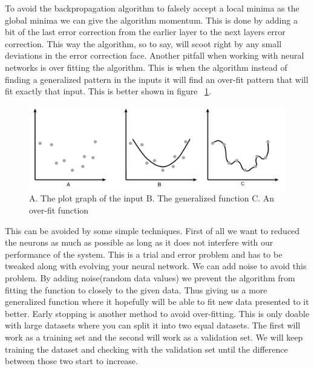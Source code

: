 To avoid the backpropagation algorithm to falsely accept a local minima as the global minima we can give the algorithm momentum. This is done by adding a bit of the last error correction from the earlier layer to the next layers error correction. This way the algorithm, so to say, will scoot right by any small deviations in the error correction face.
\newline
Another pitfall when working with neural networks is over fitting the algorithm. This is when the algorithm instead of finding a generalized pattern in the inputs it will find an over-fit pattern that will fit exactly that input. This is better shown in figure ~\ref{fig:overfitting}.
\begin{figure}[h!]
\centering
\includegraphics[width=0.8\linewidth,natwidth=1262,natheight=415]{billeder/overfitting.png}
\caption{A. The plot graph of the input B. The generalized function C. An over-fit function}
\label{fig:overfitting}
\end{figure}
This can be avoided by some simple techniques. First of all we want to reduced the neurons as much as possible as long as it does not interfere with our performance of the system. This is a trial and error problem and has to be tweaked along with evolving your neural network. We can add noise to avoid this problem. By adding noise(random data values) we prevent the algorithm from fitting the function to closely to the given data. Thus giving us a more generalized function where it hopefully will be able to fit new data presented to it better. Early stopping is another method to avoid over-fitting. This is only doable with large datasets where you can split it into two equal datasets. The first will work as a training set and the second will work as a validation set. We will keep training the dataset and checking with the validation set until the difference between those two start to increase.

